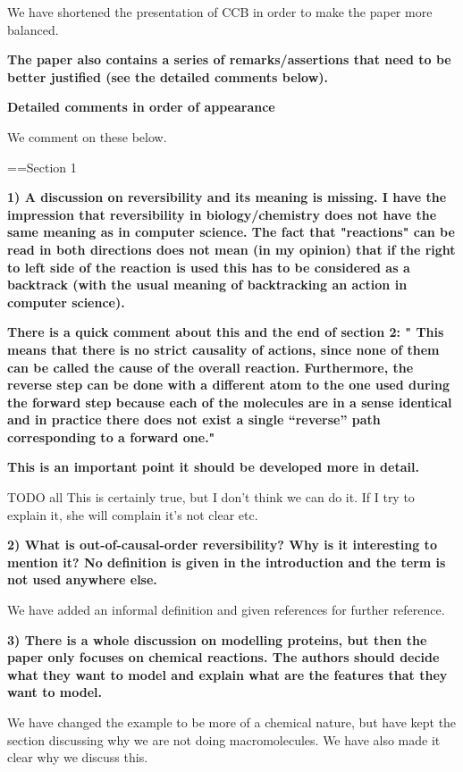 \documentclass{article}
\begin{document}
We have shortened the presentation of CCB in order to make the paper more balanced.

\textbf{The paper also contains a series of remarks/assertions that need to be better justified (see the detailed comments below).}

\textbf{Detailed comments in order of appearance}

We comment on these below.

==Section 1

\textbf{1) A discussion on reversibility and its meaning is missing. 
I have the impression that reversibility in biology/chemistry does not have the same meaning as in computer science. The fact that "reactions" can be read in both directions does not mean (in my opinion) that if the right to left side of the reaction is used this has to be considered as a backtrack (with the usual meaning of backtracking an action in computer science).}

\textbf{There is a quick comment about this and the end of section 2: " This means that there is no strict causality of actions, since none of them can be called the cause of the overall reaction. Furthermore, the reverse step can be done with a different atom to the one used during the forward step because each of the molecules are in a sense identical and in practice there does not exist a single “reverse” path corresponding to a forward one."}

\textbf{This is an important point it should be developed more in detail. }

TODO all This is certainly true, but I don't think we can do it. If I try to explain it, she will complain it's not clear etc. 

\textbf{2) What is out-of-causal-order reversibility? Why is it interesting to mention it? No definition is given in the introduction and the term is not used anywhere else.}

We have added an informal definition and given references for further reference.

\textbf{3) There is a whole discussion on modelling proteins, but then the paper only focuses on chemical reactions. 
The authors should decide what they want to model and explain what are the features that they want to model.}

We have changed the example to be more of a chemical nature, but have kept the section discussing why we are not doing macromolecules. We have also made it clear why we discuss this.
\end{document}
